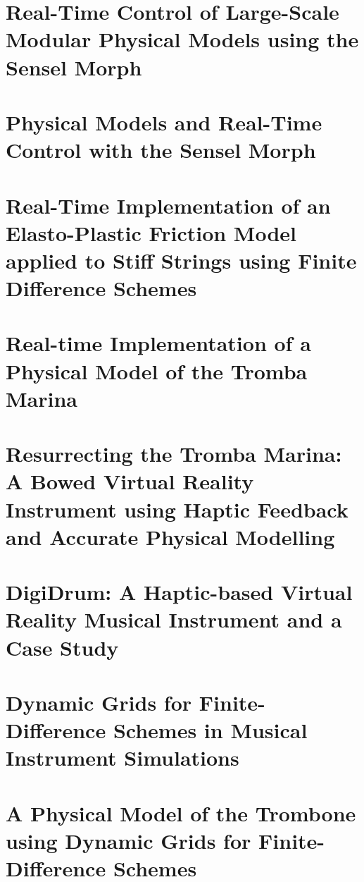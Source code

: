 \chapter{Real-Time Control of Large-Scale Modular Physical Models using the Sensel Morph}\label{paper:A}

\chapter{Physical Models and Real-Time Control with the Sensel Morph}\label{paper:B}

\chapter{Real-Time Implementation of an Elasto-Plastic Friction Model applied to Stiff Strings using Finite Difference Schemes}\label{paper:C}

\chapter{Real-time Implementation of a Physical Model of the Tromba Marina}\label{paper:D}

\chapter{Resurrecting the Tromba Marina: A Bowed Virtual Reality Instrument using Haptic Feedback and Accurate Physical Modelling}\label{paper:E}

\chapter{DigiDrum: A Haptic-based Virtual Reality Musical Instrument and a Case Study}\label{paper:F}

\chapter{Dynamic Grids for Finite-Difference Schemes in Musical Instrument Simulations}\label{paper:G}

\chapter{A Physical Model of the Trombone using Dynamic Grids for Finite-Difference Schemes}\label{paper:H}